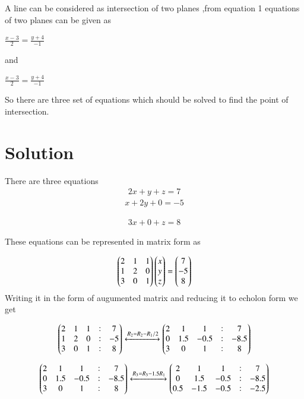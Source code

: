 \documentclass[journal,12pt,twocolumn]{IEEEtran}
\begin{document}
A line can be considered as intersection of two planes ,from equation 1 equations of two planes can be given as
\begin{center}
$\frac{x-3}{2} = \frac{y+4}{-1}$\label{eq:2}
\end{center}

and
\begin{center}
$\frac{x-3}{2} = \frac{y+4}{-1}$\label{eq:3}
\end{center}
So there are three set of equations which should be solved to find the point of intersection.





\section{Solution}
There are three equations 
\begin{align}
2x+y+z=7\label{eq:1}
\end{align}
\begin{align}
x+2y+0=-5    \label{eq:2}
\end{align}
    
\begin{align}
3x+0+z=8\label{eq:3}
\end{align}

These equations can be represented in matrix form as

\begin{align}
\begin{pmatrix}2 & 1 & 1 \\ 1 & 2 & 0\\3 & 0 &1\end{pmatrix}\begin{pmatrix}x\\y\\z\end{pmatrix}=\begin{pmatrix}7\\-5\\8\end{pmatrix}
\end{align}	
Writing it in the form of augumented matrix and reducing it to echolon form we get

\begin{align}
\begin{pmatrix}2 & 1 & 1 & :& 7\\ 1 & 2 & 0 & : & -5\\3 & 0 & 1 & : & 8\end{pmatrix} \xleftrightarrow{R_2=R_2-R_1/2}\begin{pmatrix}2 & 1 & 1 & : & 7\\0 & 1.5 & -0.5 & : & -8.5\\ 3 & 0 & 1 & : & 8 \end{pmatrix}	
\end{align}


\begin{align}
\begin{pmatrix}2 & 1 & 1 & : & 7\\0 & 1.5 & -0.5 & : & -8.5\\ 3 & 0 & 1 & : & 8 \end{pmatrix}\xleftrightarrow{R_3=R_3-1.5R_1}\begin{pmatrix}2 & 1 & 1 & : & 7\\0 & 1.5 & -0.5 & : & -8.5\\ 0.5 & -1.5 & -0.5 & : & -2.5 \end{pmatrix}    
\end{align}
\end{document}
